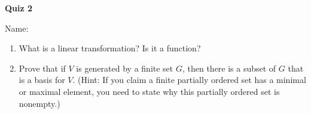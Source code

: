 \documentclass{article}
\begin{document}
\begin{center}
    {\bf Quiz 2}
\end{center}
Name:


\begin{enumerate}
    \item
        What is a linear transformation? Is it a function?
        \vfill
    \item
        Prove that if $V$ is generated by a finite set $G$, then there is a
        subset of $G$ that is a basis for $V$. (Hint: If you claim a finite
        partially ordered set has a minimal or maximal element, you need to
        state why this partially ordered set is nonempty.)
        \vfill
\end{enumerate}
    
\end{document}
